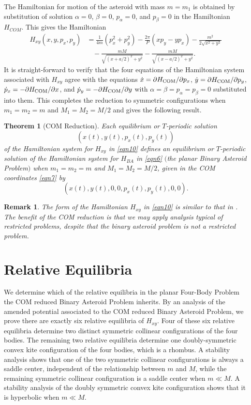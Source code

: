 \documentclass[12pt]{article}
\newtheorem{theorem}{Theorem}
\newtheorem{remark}{Remark}%
\begin{document}
The Hamiltonian for motion of the asteroid with mass $m=m_1$ is obtained by substitution of solution $\alpha=0$, $\beta=0$, $p_\alpha=0$, and $p_\beta=0$ in the Hamiltonian $H_{COM}$. This gives the Hamiltonian
\begin{align}
H_{xy}(x,y,p_x,p_y) & = \frac{1}{4m}\left(p_x^2 + p_y^2\right) - \frac{2\pi}{P}\left(xp_y - yp_x\right) - \frac{m^2}{2\sqrt{x^2+y^2}} \nonumber\\
& \ \ \ \ - \frac{mM}{\sqrt{(x+a/2)^2 + y^2}} - \frac{mM}{\sqrt{(x-a/2)^2 + y^2}}.
\label{eqn10}
\end{align}
It is straight-forward to verify that the four equations of the Hamiltonian system associated with $H_{xy}$ agree with the equations $\dot x = \partial H_{\rm COM}/\partial p_x$, $\dot y = \partial H_{\rm COM}/\partial p_y$, $\dot p_x = - \partial H_{\rm COM}/\partial x$, and $\dot p_y = - \partial H_{\rm COM}/\partial y$ with $\alpha=\beta=p_\alpha=p_\beta=0$ substituted into them. This completes the reduction to symmetric configurations when $m_1=m_2=m$ and $M_1=M_2=M/2$ and gives the following result.

\begin{theorem}[COM Reduction]\label{thm1}
Each equilibrium or $T$-periodic solution
\[ (x(t), y(t), p_x(t), p_y(t))\] 
of the Hamiltonian system for $H_{xy}$ in \eqref{eqn10} defines an equilibrium or $T$-periodic solution of the Hamiltonian system for $H_{BA}$ in \eqref{eqn6} $($the planar Binary Asteroid Problem$)$ when $m_1 = m_2 = m$ and $M_1 = M_2 = M/2$, given in the COM coordinates \eqref{eqn7} by \[ (x(t),y(t),0,0,p_x(t),p_y(t),0,0).\]
\end{theorem}

\begin{remark} The form of the Hamiltonian $H_{xy}$ in \eqref{eqn10} is similar to that in \cite{Llibre2021}. The benefit of the COM reduction is that we may apply analysis typical of restricted problems, despite that the binary asteroid problem is not a restricted problem.
\end{remark}



\section{Relative Equilibria}
We determine which of the relative equilibria in the planar Four-Body Problem \cite{Simo} the COM reduced Binary Asteroid Problem inherits. By an analysis of the amended potential associated to the COM reduced Binary Asteroid Problem, we prove there are exactly six relative equilibria of $H_{xy}$. Four of these six relative equilibria determine two distinct symmetric collinear configurations of the four bodies. The remaining two relative equilibria determine one doubly-symmetric convex kite configuration of the four bodies, which is a rhombus. A stability analysis shows that one of the two symmetric collinear configurations is always a saddle center, independent of the relationship between $m$ and $M$, while the remaining symmetric collinear configuration is a saddle center when $m \ll M$. A stability analysis of the doubly symmetric convex kite configuration shows that it is hyperbolic when $m \ll M$.
\end{document}
